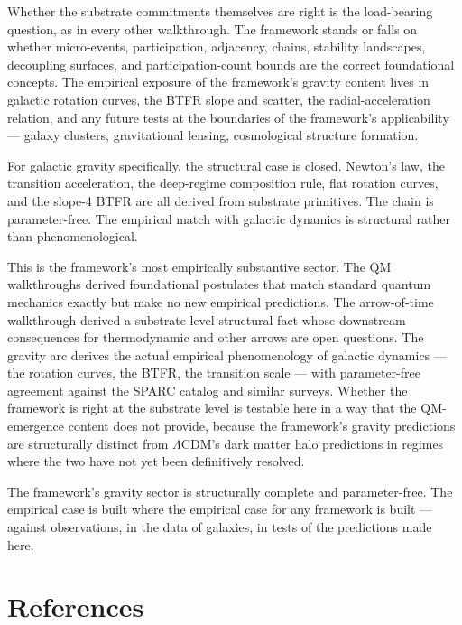 \documentclass[11pt,a4paper]{article}
\begin{document}
Whether the substrate commitments themselves are right is the load-bearing question, as in every other walkthrough. The framework stands or falls on whether micro-events, participation, adjacency, chains, stability landscapes, decoupling surfaces, and participation-count bounds are the correct foundational concepts. The empirical exposure of the framework's gravity content lives in galactic rotation curves, the BTFR slope and scatter, the radial-acceleration relation, and any future tests at the boundaries of the framework's applicability --- galaxy clusters, gravitational lensing, cosmological structure formation.

For galactic gravity specifically, the structural case is closed. Newton's law, the transition acceleration, the deep-regime composition rule, flat rotation curves, and the slope-4 BTFR are all derived from substrate primitives. The chain is parameter-free. The empirical match with galactic dynamics is structural rather than phenomenological.

This is the framework's most empirically substantive sector. The QM walkthroughs derived foundational postulates that match standard quantum mechanics exactly but make no new empirical predictions. The arrow-of-time walkthrough derived a substrate-level structural fact whose downstream consequences for thermodynamic and other arrows are open questions. The gravity arc derives the actual empirical phenomenology of galactic dynamics --- the rotation curves, the BTFR, the transition scale --- with parameter-free agreement against the SPARC catalog and similar surveys. Whether the framework is right at the substrate level is testable here in a way that the QM-emergence content does not provide, because the framework's gravity predictions are structurally distinct from $\Lambda$CDM's dark matter halo predictions in regimes where the two have not yet been definitively resolved.

The framework's gravity sector is structurally complete and parameter-free. The empirical case is built where the empirical case for any framework is built --- against observations, in the data of galaxies, in tests of the predictions made here.

\section*{References}
\end{document}
